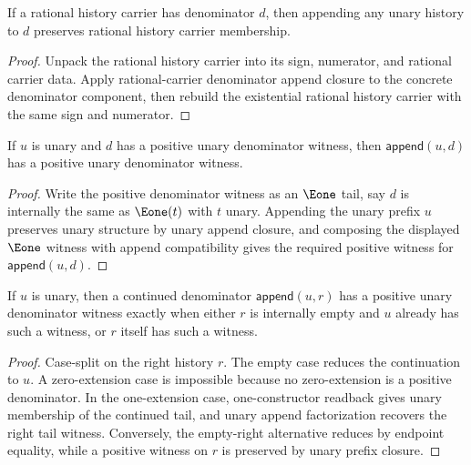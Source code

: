 \begin{theorem}
\label{thm:rat-history-carrier-append-unary-denominator-closed}
If a rational history carrier has denominator \(d\), then appending any unary history to \(d\) preserves rational history carrier membership.
\end{theorem}
\begin{proof}
Unpack the rational history carrier into its sign, numerator, and rational carrier data. Apply rational-carrier denominator append closure to the concrete denominator component, then rebuild the existential rational history carrier with the same sign and numerator.
\end{proof}

\begin{theorem}
\label{thm:rat-positive-denominator-append-unary-prefix}
If $u$ is unary and $d$ has a positive unary denominator witness, then
$\mathsf{append}(u,d)$ has a positive unary denominator witness.
\end{theorem}
\begin{proof}
Write the positive denominator witness as an $\Eone$ tail, say $d$ is
internally the same as $\Eone(t)$ with $t$ unary. Appending the unary prefix
$u$ preserves unary structure by unary append closure, and composing the
displayed $\Eone$ witness with append compatibility gives the required
positive witness for $\mathsf{append}(u,d)$.
\end{proof}

\begin{theorem}
\label{thm:positive-unary-denominator-append-unary-left-iff}
If $u$ is unary, then a continued denominator
$\mathsf{append}(u,r)$ has a positive unary denominator witness exactly when
either $r$ is internally empty and $u$ already has such a witness, or $r$
itself has such a witness.
\end{theorem}
\begin{proof}
Case-split on the right history $r$. The empty case reduces the continuation
to $u$. A zero-extension case is impossible because no zero-extension is a
positive denominator. In the one-extension case, one-constructor readback gives
unary membership of the continued tail, and unary append factorization recovers
the right tail witness. Conversely, the empty-right alternative reduces by
endpoint equality, while a positive witness on $r$ is preserved by unary
prefix closure.
\end{proof}

